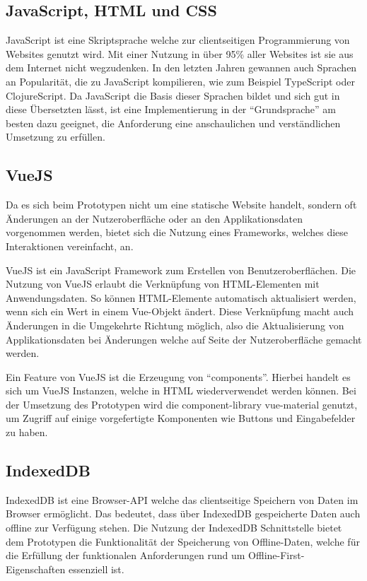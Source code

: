 \documentclass[a4paper, 12pt]{scrreprt}
\begin{document}
\subsection{JavaScript, HTML und CSS}
JavaScript ist eine Skriptsprache welche zur clientseitigen Programmierung von Websites genutzt wird. Mit einer Nutzung in über 95\% \autocite{OnlineJavascriptDistr} aller Websites ist sie aus dem Internet nicht wegzudenken. In den letzten Jahren gewannen auch Sprachen an Popularität, die zu JavaScript kompilieren, wie zum Beispiel TypeScript oder ClojureScript. Da JavaScript die Basis dieser Sprachen bildet und sich gut in diese Übersetzten lässt, ist eine Implementierung in der \enquote{Grundsprache} am besten dazu geeignet, die Anforderung eine anschaulichen und verständlichen Umsetzung zu erfüllen.
\subsection{VueJS}
Da es sich beim Prototypen nicht um eine statische Website handelt, sondern oft Änderungen an der Nutzeroberfläche oder an den Applikationsdaten vorgenommen werden, bietet sich die Nutzung eines Frameworks, welches diese Interaktionen vereinfacht, an. 

VueJS ist ein JavaScript Framework zum Erstellen von Benutzeroberflächen. Die Nutzung von VueJS erlaubt die Verknüpfung von HTML-Elementen mit Anwendungsdaten. So können HTML-Elemente automatisch aktualisiert werden, wenn sich ein Wert in einem Vue-Objekt ändert. Diese Verknüpfung macht auch Änderungen in die Umgekehrte Richtung möglich, also die Aktualisierung von Applikationsdaten bei Änderungen welche auf Seite der Nutzeroberfläche gemacht werden.

Ein Feature von VueJS ist die Erzeugung von \enquote{components}. Hierbei handelt es sich um VueJS Instanzen, welche in HTML wiederverwendet werden können. Bei der Umsetzung des Prototypen wird die component-library vue-material genutzt, um Zugriff auf einige vorgefertigte Komponenten wie Buttons und Eingabefelder zu haben. 
\subsection{IndexedDB}
IndexedDB ist eine Browser-API welche das clientseitige Speichern von Daten im Browser ermöglicht. Das bedeutet, dass über IndexedDB gespeicherte Daten auch offline zur Verfügung stehen. Die Nutzung der IndexedDB Schnittstelle bietet dem Prototypen die Funktionalität der Speicherung von Offline-Daten, welche für die Erfüllung der funktionalen Anforderungen rund um Offline-First-Eigenschaften essenziell ist. 
\end{document}
